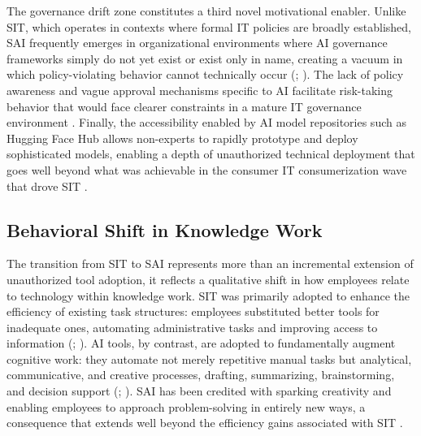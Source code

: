\documentclass[12pt,oneside]{article}
\begin{document}
The governance drift zone constitutes a third novel motivational enabler. Unlike \ac{SIT}, which operates in contexts where formal \ac{IT} policies are broadly established, \ac{SAI} frequently emerges in organizational environments where \ac{AI} governance frameworks simply do not yet exist or exist only in name, creating a vacuum in which policy-violating behavior cannot technically occur (\citealp[1]{silic2025shadow}; \citealp[1138]{raizada2026shadowai}). The lack of policy awareness and vague approval mechanisms specific to \ac{AI} facilitate risk-taking behavior that would face clearer constraints in a mature \ac{IT} governance environment \citep[1140]{raizada2026shadowai}. Finally, the accessibility enabled by \ac{AI} model repositories such as Hugging Face Hub allows non-experts to rapidly prototype and deploy sophisticated models, enabling a depth of unauthorized technical deployment that goes well beyond what was achievable in the consumer \ac{IT} consumerization wave that drove \ac{SIT} \citep[973]{puthal2025shadowai}.

\subsection{Behavioral Shift in Knowledge Work} \label{behavioral-shift-in-knowledge-work}

The transition from \ac{SIT} to \ac{SAI} represents more than an incremental extension of unauthorized tool adoption, it reflects a qualitative shift in how employees relate to technology within knowledge work. \ac{SIT} was primarily adopted to enhance the efficiency of existing task structures: employees substituted better tools for inadequate ones, automating administrative tasks and improving access to information (\citealp[114]{white2023workarounds}; \citealp[2]{koch2014consumerization}). \ac{AI} tools, by contrast, are adopted to fundamentally augment cognitive work: they automate not merely repetitive manual tasks but analytical, communicative, and creative processes, drafting, summarizing, brainstorming, and decision support (\citealp[4]{ross2025shadowai}; \citealp[7]{silic2025shadow}). \ac{SAI} has been credited with sparking creativity and enabling employees to approach problem-solving in entirely new ways, a consequence that extends well beyond the efficiency gains associated with \ac{SIT} \citep[9]{silic2025shadow}.
\end{document}

